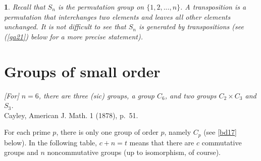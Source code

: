 \documentclass[a4paper,11pt,final]{memoir}%
\newtheorem{plain}[X]{}
\theoremstyle{nonumberplain}
\begin{document}
\begin{plain}
\label{bd8d}Recall that $S_{n}$
%
is the permutation group on $\{1,2,...,n\}$. A \emph{transposition}%
is a permutation that interchanges two elements and leaves all other elements
unchanged. It is not difficult to see that $S_{n}$ is generated by
transpositions (see (\ref{ga21}) below for a more precise statement).
\end{plain}

\section{Groups of small order}%

%
\hfill\begin{minipage}{3.0in}
\textit{[For] $n=6$, there are three \textnormal{(sic)} groups, a group $C_6$, and two groups
$C_2\times C_3$ and $S_3$.}\\
Cayley, American J. Math. 1 (1878), p.~51.
\end{minipage}\bigskip

For each prime $p$, there is only one group of order $p$, namely $C_{p}$ (see
\ref{bd17} below). In the following table, $c+n=t$ means that there are $c$
commutative groups and $n$ noncommutative groups (up to isomorphism, of
course).\medskip
\end{document}
